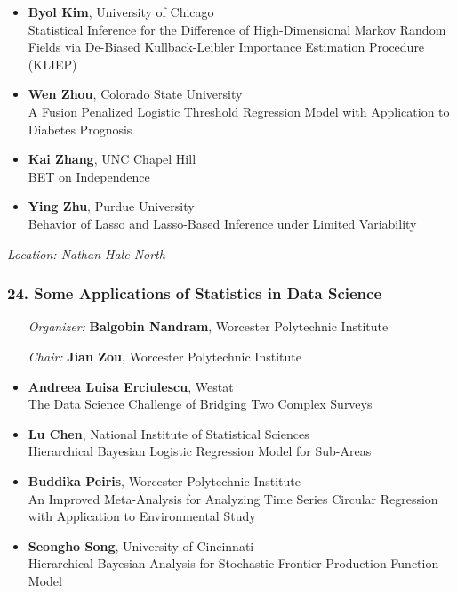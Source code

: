 \begin{itemize}
\item \textbf{Byol Kim}, University of Chicago \\
Statistical Inference for the Difference of High-Dimensional Markov Random Fields via De-Biased Kullback-Leibler Importance Estimation Procedure (KLIEP)
\item \textbf{Wen Zhou}, Colorado State University \\
A Fusion Penalized Logistic Threshold Regression Model with Application to Diabetes Prognosis
\item \textbf{Kai Zhang}, UNC Chapel Hill \\
BET on Independence
\item \textbf{Ying Zhu}, Purdue University \\
Behavior of Lasso and Lasso-Based Inference under Limited Variability
\end{itemize}

\emph{Location: Nathan Hale North}

\subsubsection*{24. Some Applications of Statistics in Data Science}

\begin{enumerate}[align=left]
\item [\emph{Organizer:}] \textbf{Balgobin Nandram}, Worcester Polytechnic Institute
\item [\emph{Chair:}] \textbf{Jian Zou},  Worcester Polytechnic Institute
\end{enumerate}

\begin{itemize}
\item \textbf{Andreea Luisa Erciulescu}, Westat \\
The Data Science Challenge of Bridging Two Complex Surveys
\item \textbf{Lu Chen}, National Institute of Statistical Sciences \\
Hierarchical Bayesian Logistic Regression Model for Sub-Areas
\item \textbf{Buddika Peiris}, Worcester Polytechnic Institute \\
An Improved Meta-Analysis for Analyzing Time Series Circular Regression with Application to Environmental Study
\item \textbf{Seongho Song}, University of Cincinnati \\
Hierarchical Bayesian Analysis for Stochastic Frontier Production Function Model
\end{itemize}

